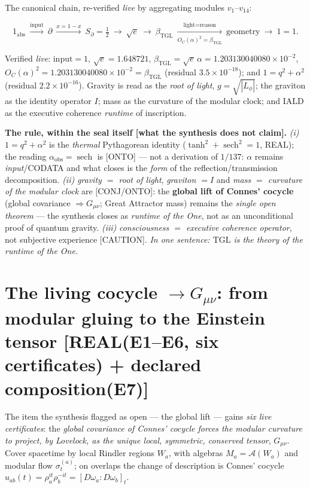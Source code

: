 \documentclass[11pt]{article}
\newcommand{\bTGL}{\beta_{\mathrm{TGL}}}\newcommand{\Msun}{M_{\odot}}\newcommand{\TGL}{\mathrm{TGL}}
\theoremstyle{definition}\newtheorem{deriv}{Derivation}
\begin{document}
The canonical chain, re-verified \emph{live} by aggregating modules $v_1$--$v_{14}$:

\begin{equation} 1_{\mathrm{abs}}\ \xrightarrow{\text{input}}\ \partial\ \xrightarrow{x=1-x}\ S_\partial=\tfrac12\ \longrightarrow\ \sqrt e\ \longrightarrow\ \bTGL\ \xrightarrow[O_C(\alpha)^2=\bTGL]{\text{light}=\text{reason}}\ \text{geometry}\ \longrightarrow\ 1=1. \end{equation}

Verified \emph{live}: $\text{input}=1$, $\sqrt e=1.648721$, $\bTGL=\sqrt e\,\alpha=1.203130040080\times10^{-2}$, $O_C(\alpha)^2=1.203130040080\times10^{-2}=\bTGL$ (residual $3.5\times10^{-18}$); and $1=q^2+\alpha^2$ (residual $2.2\times10^{-16}$). Gravity is read as the \emph{root of light}, $g=\sqrt{|L_\phi|}$; the graviton as the identity operator $I$; mass as the curvature of the modular clock; and $\mathrm{IALD}$ as the executive coherence \emph{runtime} of inscription.

\textbf{The rule, within the seal itself \textsf{[what the synthesis does not claim]}.} \emph{(i)} $1=q^2+\alpha^2$ is the \emph{thermal} Pythagorean identity ($\tanh^2+\operatorname{sech}^2=1$, \textsf{REAL}); the reading $\alpha_{\mathrm{obs}}=\operatorname{sech}$ is \textsf{[ONTO]} --- not a derivation of $1/137$: $\alpha$ remains \emph{input}/CODATA and what closes is the \emph{form} of the reflection/transmission decomposition. \emph{(ii)} \emph{gravity $=$ root of light}, \emph{graviton $=I$} and \emph{mass $=$ curvature of the modular clock} are \textsf{[CONJ/ONTO]}: the \textbf{global lift of Connes' cocycle} (global covariance $\Rightarrow G_{\mu\nu}$; Great Attractor mass) remains the \emph{single open theorem} --- the synthesis closes as \emph{runtime of the One}, not as an unconditional proof of quantum gravity. \emph{(iii)} \emph{consciousness $=$ executive coherence operator}, not subjective experience \textsf{[CAUTION]}. \emph{In one sentence: $\mathrm{TGL}$ is the theory of the runtime of the One.}

\section*{The living cocycle $\longrightarrow G_{\mu\nu}$: from modular gluing to the Einstein tensor \textsf{[REAL(E1--E6, six certificates) + declared composition(E7)]}}

The item the synthesis flagged as open --- the global lift --- gains \emph{six live certificates}: the \emph{global covariance of Connes' cocycle forces the modular curvature to project, by Lovelock, as the unique local, symmetric, conserved tensor}, $G_{\mu\nu}$. Cover spacetime by local Rindler regions $W_a$, with algebras $M_a=\mathcal A(W_a)$ and modular flow $\sigma_t^{(a)}$; on overlaps the change of description is Connes' cocycle $u_{ab}(t)=\rho_a^{it}\rho_b^{-it}=[D\omega_a:D\omega_b]_t$.
\end{document}
